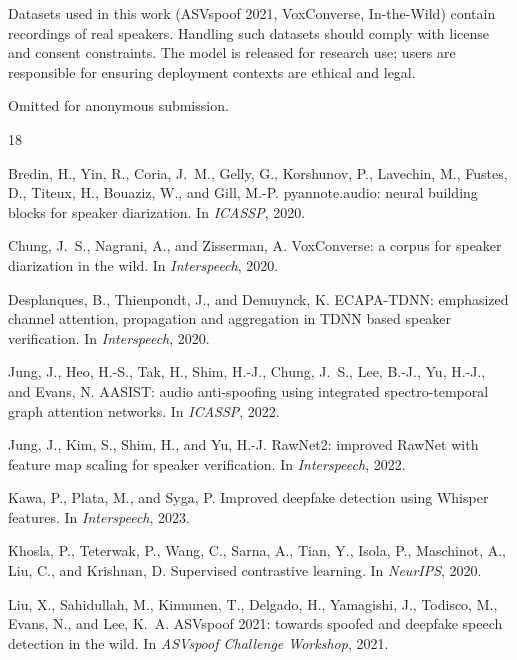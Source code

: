\documentclass{article}
\begin{document}
Datasets used in this work (ASVspoof 2021, VoxConverse, In-the-Wild) contain
recordings of real speakers. Handling such datasets should comply with license
and consent constraints. The model is released for research use; users are
responsible for ensuring deployment contexts are ethical and legal.

\begin{ack}
Omitted for anonymous submission.
\end{ack}

\begin{thebibliography}{18}

Bredin, H., Yin, R., Coria, J.~M., Gelly, G., Korshunov, P., Lavechin, M.,
  Fustes, D., Titeux, H., Bouaziz, W., and Gill, M.-P.
\newblock pyannote.audio: neural building blocks for speaker diarization.
\newblock In \emph{ICASSP}, 2020.

Chung, J.~S., Nagrani, A., and Zisserman, A.
\newblock VoxConverse: a corpus for speaker diarization in the wild.
\newblock In \emph{Interspeech}, 2020.

Desplanques, B., Thienpondt, J., and Demuynck, K.
\newblock ECAPA-TDNN: emphasized channel attention, propagation and aggregation
  in TDNN based speaker verification.
\newblock In \emph{Interspeech}, 2020.

Jung, J., Heo, H.-S., Tak, H., Shim, H.-J., Chung, J.~S., Lee, B.-J., Yu,
  H.-J., and Evans, N.
\newblock AASIST: audio anti-spoofing using integrated spectro-temporal graph
  attention networks.
\newblock In \emph{ICASSP}, 2022.

Jung, J., Kim, S., Shim, H., and Yu, H.-J.
\newblock RawNet2: improved RawNet with feature map scaling for speaker
  verification.
\newblock In \emph{Interspeech}, 2022.

Kawa, P., Plata, M., and Syga, P.
\newblock Improved deepfake detection using Whisper features.
\newblock In \emph{Interspeech}, 2023.

Khosla, P., Teterwak, P., Wang, C., Sarna, A., Tian, Y., Isola, P.,
  Maschinot, A., Liu, C., and Krishnan, D.
\newblock Supervised contrastive learning.
\newblock In \emph{NeurIPS}, 2020.

Liu, X., Sahidullah, M., Kinnunen, T., Delgado, H., Yamagishi, J., Todisco,
  M., Evans, N., and Lee, K.~A.
\newblock ASVspoof 2021: towards spoofed and deepfake speech detection in the
  wild.
\newblock In \emph{ASVspoof Challenge Workshop}, 2021.


\end{thebibliography}
\end{document}
